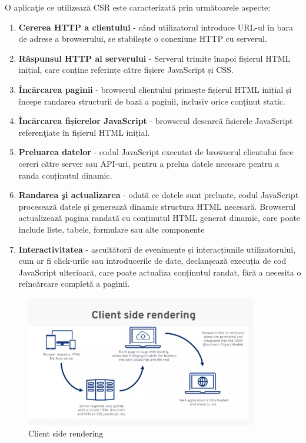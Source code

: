 \documentclass[12pt, a4paper]{report}
\begin{document}
O aplica\c tie ce utilizeaz\u a CSR este caracterizat\u a prin urm\u atoarele aspecte:
\begin{enumerate}
	\item \textbf{Cererea HTTP a clientului} - când utilizatorul introduce URL-ul în bara de adrese a browserului, se stabilește o conexiune HTTP cu serverul.
	\item \textbf{Răspunsul HTTP al serverului} - Serverul trimite înapoi fișierul HTML inițial, care conține referințe către fișiere JavaScript și CSS.
	\item \textbf{Încărcarea paginii} - browserul clientului primește fișierul HTML inițial și începe randarea structurii de bază a paginii, inclusiv orice conținut static.
	\item \textbf{Încărcarea fișierelor JavaScript} - browserul descarcă fișierele JavaScript referen\c tiate în fișierul HTML inițial.
	\item \textbf{Preluarea datelor} - codul JavaScript executat de browserul clientului face cereri către server sau API-uri, pentru a prelua datele necesare pentru a randa conținutul dinamic.
	\item \textbf{Randarea \c si actualizarea} - odată ce datele sunt preluate, codul JavaScript procesează datele și generează dinamic structura HTML necesară. Browserul actualizează pagina randat\u a cu conținutul HTML generat dinamic, care poate include liste, tabele, formulare sau alte componente
	\item \textbf{Interactivitatea} - ascultătorii de evenimente și interacțiunile utilizatorului, cum ar fi click-urile sau introducerile de date, declanșează execuția de cod JavaScript ulterioară, care poate actualiza conținutul randat, fără a necesita o reîncărcare completă a paginii.
\end{enumerate}

\begin{figure}[htbp]
	\centering
	\includegraphics[width=0.9\textwidth]{csr-diagram.png}
	\caption{Client side rendering}
	\label{fig:csr-diagram}
\end{figure}
\end{document}
